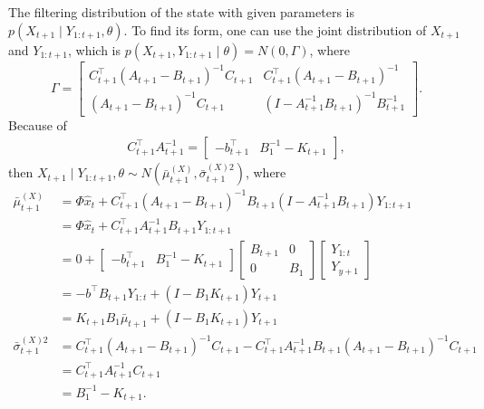 The filtering distribution of the state with given parameters is $p\left(X_{t+1}\mid Y_{1:t+1}, \theta \right)$. To find its form, one can use the joint distribution of $X_{t+1}$ and $Y_{1:t+1}$, which is $p\left(X_{t+1}, Y_{1:t+1}  \mid  \theta\right)= N\left(0,\Gamma\right)$, where
\begin{equation*}
\Gamma=\begin{bmatrix} C_{t+1}^\top\left(A_{t+1}-B_{t+1}\right)^{-1}C_{t+1} & C_{t+1}^\top\left(A_{t+1}-B_{t+1}\right)^{-1}\\\left(A_{t+1}-B_{t+1}\right)^{-1}C_{t+1} & \left(I-A_{t+1}^{-1}B_{t+1}\right)^{-1}B_{t+1}^{-1} \end{bmatrix}.
\end{equation*}
Because of 
\begin{align*}
C_{t+1}^\top A_{t+1}^{-1} = \begin{bmatrix} - b_{t+1}^\top & B_1^{-1}- K_{t+1} \end{bmatrix},
\end{align*}
then $X_{t+1}\mid Y_{1:t+1},\theta \sim N\left(\bar{\mu}_{t+1}^{\left(X\right)},\bar{\sigma}_{t+1}^{\left(X\right)2}\right)$, where
\begin{align*}
\bar{\mu}_{t+1}^{\left(X\right)}       &= \Phi \hat{x}_{t} +  C_{t+1}^\top \left(A_{t+1}-B_{t+1}\right)^{-1}B_{t+1} \left(I-A_{t+1}^{-1}B_{t+1}\right)Y_{1:t+1}\\
                      &= \Phi \hat{x}_{t} +  C_{t+1}^\top A_{t+1}^{-1}B_{t+1} Y_{1:t+1} \\ 
                      &=0+ \begin{bmatrix} - b_{t+1}^\top & B_1^{-1}-K_{t+1} \end{bmatrix}\begin{bmatrix} B_{t+1} & 0 \\ 0 & B_1 \end{bmatrix} \begin{bmatrix} Y_{1:t} \\ Y_{y+1} \end{bmatrix} \\
                      &=   -b^\top B_{t+1} Y_{1:t} + \left(I - B_1K_{t+1}\right)Y_{t+1} \\
                      & =  K_{t+1}B_1\bar{\mu}_{t+1 } + \left(I - B_1K_{t+1}\right)Y_{t+1}  \\
\bar{\sigma}_{t+1}^{\left(X\right)2} %
                      &= C_{t+1}^\top\left(A_{t+1}-B_{t+1}\right)^{-1}C_{t+1} -  C_{t+1}^\top A_{t+1}^{-1}B_{t+1}\left(A_{t+1}-B_{t+1}\right)^{-1}C_{t+1}\\
                      &= C_{t+1}^\top A_{t+1}^{-1}C_{t+1} \\ &=B_1^{-1}-K_{t+1}.
\end{align*}




